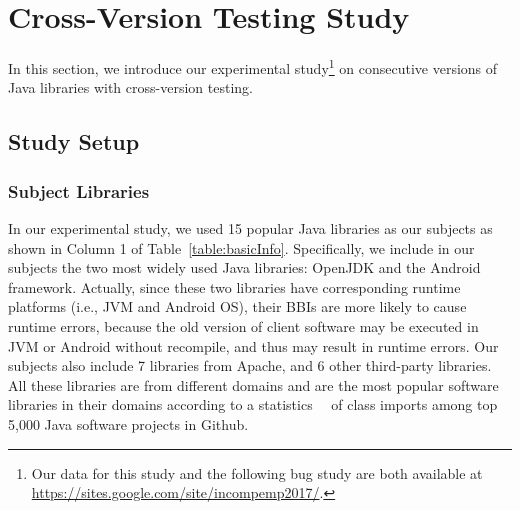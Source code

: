 \section{Cross-Version Testing Study}
\label{sec:studylib}
In this section, we introduce our experimental study\footnote{Our data for this study and the following bug study are both available at \url{https://sites.google.com/site/incompemp2017/}.} on consecutive versions of Java libraries with cross-version testing. 

\subsection{Study Setup}
\subsubsection{Subject Libraries}
In our experimental study, we used 15 popular Java libraries as our subjects as shown in Column 1 of Table~\ref{table:basicInfo}. Specifically, we include in our subjects the two most widely used Java libraries: OpenJDK and the Android framework. Actually, since these two libraries have corresponding runtime platforms (i.e., JVM and Android OS), their BBIs are more likely to cause runtime errors, because the old version of client software may be executed in JVM or Android without recompile, and thus may result in runtime errors. Our subjects also include 7 libraries from Apache, and 6 other third-party libraries. All these libraries are from different domains and are the most popular software libraries in their domains according to a statistics~\cite{QSIC14}~\cite{techstat} of class imports among top 5,000 Java software projects in Github.



